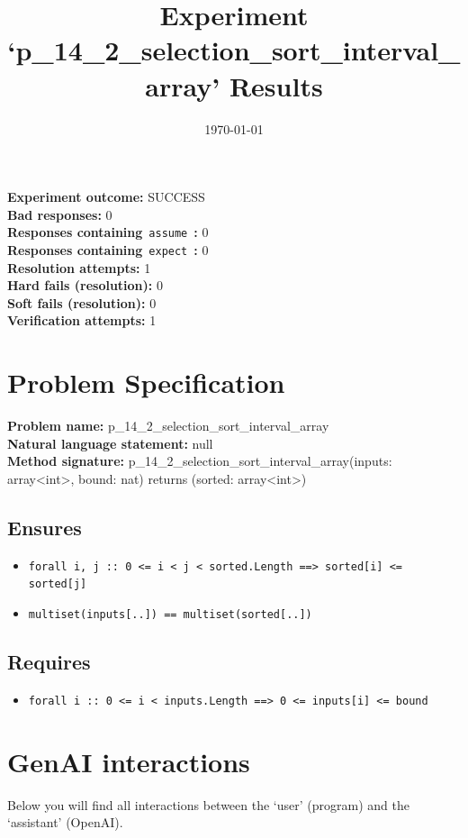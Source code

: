 \documentclass{article}
\begin{document}
\title{Experiment `p\_14\_2\_selection\_sort\_interval\_array' Results}
\author{\today}
\date{}
\maketitle
\textbf{Experiment outcome: }SUCCESS
\\\textbf{Bad responses: }0
\\\textbf{Responses containing}~\texttt{assume}~\textbf{: }0
\\\textbf{Responses containing}~\texttt{expect}~\textbf{: }0
\\\textbf{Resolution attempts: }1
\\\textbf{Hard fails (resolution): }0
\\\textbf{Soft fails (resolution): }0
\\\textbf{Verification attempts: }1
\section*{Problem Specification}
\textbf{Problem name: }p\_14\_2\_selection\_sort\_interval\_array
\\\textbf{Natural language statement: }null
\\\textbf{Method signature: }p\_14\_2\_selection\_sort\_interval\_array(inputs: array<int>, bound: nat) returns (sorted: array<int>)
\subsection*{Ensures}
\begin{itemize}
\item \texttt{forall i, j :: 0 <= i < j < sorted.Length ==> sorted[i] <= sorted[j]}
\item \texttt{multiset(inputs[..]) == multiset(sorted[..])}
\end{itemize}
\subsection*{Requires}
\begin{itemize}
\item \texttt{forall i :: 0 <= i < inputs.Length ==> 0 <= inputs[i] <= bound}
\end{itemize}
\clearpage
\section*{GenAI interactions}
Below you will find all interactions between the `user' (program) and the `assistant' (OpenAI).
\end{document}
